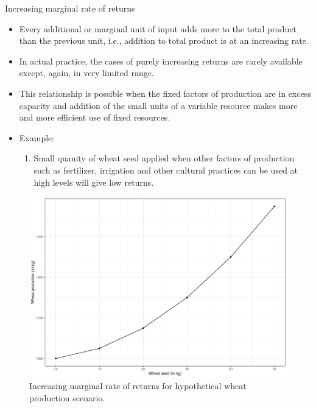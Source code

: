 \documentclass[12pt,ignorenonframetext,aspectratio=169]{beamer}
\providecommand{\tightlist}{%
  \setlength{\itemsep}{0pt}\setlength{\parskip}{0pt}}
\begin{document}
\begin{frame}{Increasing marginal rate of returns}
\protect\hypertarget{increasing-marginal-rate-of-returns}{}
\begin{itemize}
\tightlist
\item
  Every additional or marginal unit of input adds more to the total
  product than the previous unit, i.e., addition to total product is at
  an increasing rate.
\item
  In actual practice, the cases of purely increasing returns are rarely
  available except, again, in very limited range.
\item
  This relationship is possible when the fixed factors of production are
  in excess capacity and addition of the small units of a variable
  resource makes more and more efficient use of fixed resources.
\item
  Example:

  \begin{enumerate}
  \tightlist
  \item
    Small quanity of wheat seed applied when other factors of production
    such as fertilizer, irrigation and other cultural practices can be
    used at high levels will give low returns.
  \end{enumerate}
\end{itemize}
\end{frame}

\begin{frame}{}
\protect\hypertarget{section-5}{}
\begin{figure}
\includegraphics[width=0.45\linewidth]{production_relationship_files/figure-beamer/nitrogen-wheat-imr-fig-1} \caption{Increasing marginal rate of returns for hypothetical wheat production scenario.}\label{fig:nitrogen-wheat-imr-fig}
\end{figure}
\end{frame}
\end{document}
